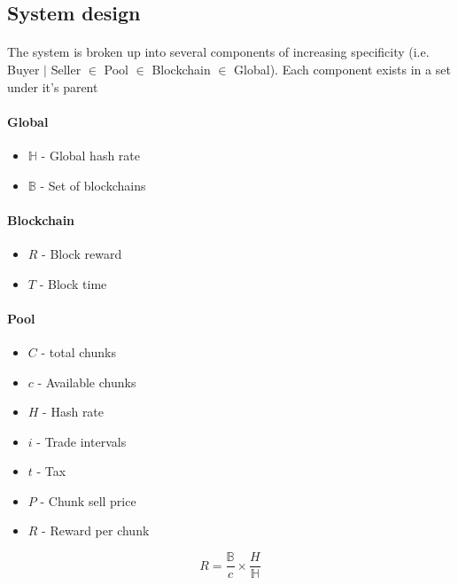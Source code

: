 \subsection{System design} %

\paragraph{} The system is broken up into several components of increasing specificity (i.e. Buyer $|$ Seller $\in$ Pool $\in$ Blockchain $\in$ Global). Each component exists in a set under it's parent

\paragraph{Global} 

\begin{itemize}
  \item $\mathbb{H}$ - Global hash rate
  \item $\mathbb{B}$ - Set of blockchains
\end{itemize}

\paragraph{Blockchain}

\begin{itemize}
  \item $R$ - Block reward
  \item $T$ - Block time
\end{itemize}

\paragraph{Pool}

\begin{itemize}
  \item $C$ - total chunks
  \item $c$ - Available chunks
  \item $H$ - Hash rate
  \item $i$ - Trade intervals 
  \item $t$ - Tax
  \item $P$ - Chunk sell price
  \item $R$ - Reward per chunk
\end{itemize}

\begin{equation}
  R = \frac{\mathbb{B}}{c} \times \frac{H}{\mathbb{H}}
\end{equation}

